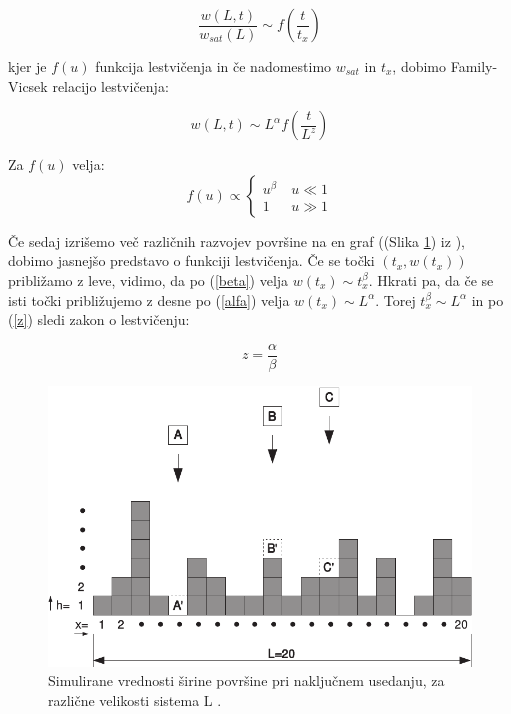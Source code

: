\documentclass[a4paper, twoside, 12pt]{book}
\begin{document}
  \begin{equation}
    \frac{w(L,t)}{w_{sat}(L)} \sim f(\frac{t}{t_x})
  \end{equation}

  kjer je $f(u)$ funkcija lestvičenja in če nadomestimo $w_{sat}$ in $t_x$, dobimo Family-Vicsek relacijo lestvičenja:

  \begin{equation}
    w(L,t) \sim L^\alpha f(\frac{t}{L^z})
    \label{family-vicsek}
  \end{equation}

  Za $f(u)$ velja:
  \begin{equation}
    f(u) \propto \left \{ \begin{array}{lr} u^{\beta} & \ u\ll 1 \\
      1 & \ u\gg1\end{array} \right. 
    \end{equation}

    Če sedaj izrišemo več različnih razvojev površine na en graf ((Slika \ref{fig:barabasi}) iz \cite{barabasi1995fractal}), dobimo jasnejšo predstavo o funkciji lestvičenja. Če se točki $(t_x,w(t_x))$ približamo z leve, vidimo, da po (\ref{beta}) velja $w(t_x) \sim t_x^\beta$. Hkrati pa, da če se isti točki približujemo z desne po (\ref{alfa}) velja $w(t_x) \sim L^\alpha$. Torej $t_x^\beta \sim L^\alpha$ in po (\ref{z}) sledi zakon o lestvičenju:

    \begin{equation}
      z = \frac{\alpha}{\beta}
    \end{equation}

    \begin{figure}[h]
      \begin{center}
        \includegraphics[width=12cm]{slike/bdep2}
      \end{center}
      \caption{Simulirane vrednosti širine površine pri naključnem usedanju, za različne velikosti sistema L \cite{schwettmann2003}.}
      \label{fig:barabasi}
    \end{figure}
\end{document}
